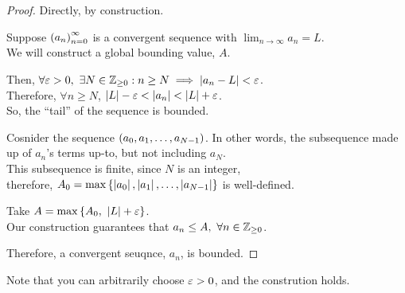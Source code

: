 \documentclass[a4paper,12pt]{report}
\begin{document}
\newpage
{}
\sol 
\begin{proof}
	Directly, by construction.
	\begin{list}{}{\setlength{\leftmargin}{1in}\setlength{\topsep}{0pt}}\item
		Suppose $\left( a_n \right)_{n=0}^{\infty}$ is a convergent sequence with $\lim_{n\to\infty} a_n = L$. \\
		We will construct a global bounding value, $A$.

		Then, $\forall \varepsilon > 0,\ \exists N\in\mathbb{Z}_{\geq0}: n\geq N\implies \left| a_n - L \right| < \varepsilon$. \\
		Therefore, $\forall n\geq N$, $\left| L \right|-\varepsilon < \left| a_n \right| < \left| L \right|+\varepsilon$. \\
		So, the ``tail'' of the sequence is bounded.

		Cosnider the sequence $\left( a_0, a_1,\dots,a_{N-1} \right)$. In other words, the subsequence made up of $a_n$'s terms up-to, but not including $a_N$. \\
		This subsequence is finite, since $N$ is an integer, \\
		therefore, $A_0 = \max\left\lbrace \left| a_0 \right|, \left| a_1 \right|, \dots, \left| a_{N-1} \right| \right\rbrace$ is well-defined.

		Take $A = \max\braces{A_0,\ \abs{L}+\veps}$. \\
		Our construction guarantees that $a_n \leq A,\ \forall n\in\bbz_{\geq0}$. \\
	\end{list}
	Therefore, a convergent seuqnce, $a_n$, is bounded.
\end{proof}

Note that you can arbitrarily choose $\varepsilon>0$, and the constrution holds.
\end{document}
